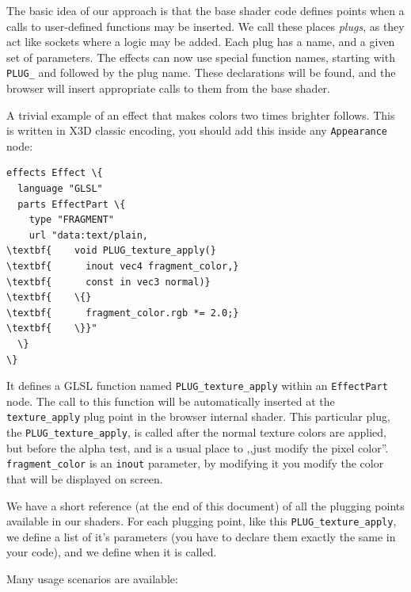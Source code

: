 \documentclass{acmsiggraph}                     %
\begin{document}
The basic idea of our approach is that the base shader code defines
points when a calls to user-defined functions may be inserted. We call
these places \textit{plugs}, as they act like sockets where a logic
may be added. Each plug has a name, and a given set of parameters.
The effects can now use special function names, starting with \texttt{PLUG\_}
and followed by the plug name. These declarations will be found,
and the browser will insert appropriate calls to them from the base shader.

A trivial example of an effect that makes colors two times brighter
follows. This is written in X3D classic encoding,
you should add this inside any \texttt{Appearance} node:

\begin{Verbatim}[commandchars=\\\{\},frame=single]
effects Effect \{
  language "GLSL"
  parts EffectPart \{
    type "FRAGMENT"
    url "data:text/plain,
\textbf{    void PLUG_texture_apply(}
\textbf{      inout vec4 fragment_color,}
\textbf{      const in vec3 normal)}
\textbf{    \{}
\textbf{      fragment_color.rgb *= 2.0;}
\textbf{    \}}"
  \}
\}
\end{Verbatim}

It defines a GLSL function named \texttt{PLUG\_texture\_apply}
within an \texttt{EffectPart} node. The call to this function will
be automatically inserted at the \texttt{texture\_apply} plug point in
the browser internal shader. This particular plug,
the \texttt{PLUG\_texture\_apply}, is called after the normal texture colors
are applied, but before the alpha test, and is a usual place to ,,just modify the pixel color''.
\texttt{fragment\_color} is an \texttt{inout} parameter, by modifying it
you modify the color that will be displayed on screen.

We have a short reference (at the end of this document) of all
the plugging points available in our shaders. For each plugging point,
like this \texttt{PLUG\_texture\_apply}, we define a list of it's parameters
(you have to declare them exactly the same in your code), and we define
when it is called.

Many usage scenarios are available:
\end{document}
